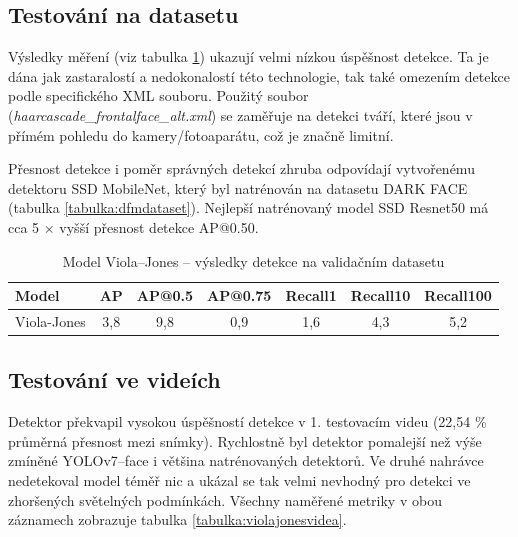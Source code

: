 \subsection*{Testování na datasetu}
Výsledky měření (viz tabulka \ref{tabulka:violajones}) ukazují velmi nízkou úspěšnost detekce. Ta je dána jak zastaralostí a nedokonalostí této technologie, tak také omezením detekce podle specifického XML souboru. Použitý soubor (\emph{haarcascade\_frontalface\_alt.xml}) se zaměřuje na detekci tváří, které jsou v přímém pohledu do kamery/fotoaparátu, což je značně limitní. 

Přesnost detekce i poměr správných detekcí zhruba odpovídají vytvořenému detektoru SSD MobileNet, který byl natrénován na datasetu DARK FACE (tabulka \ref{tabulka:dfmdataset}). Nejlepší natrénovaný model SSD Resnet50 má cca 5 $\times$ vyšší přesnost detekce AP@0.50.

\begin{table}[H]
  \begin{center}
    \begin{tabular}{|l|c|c|c|c|c|c|}
    \hline
    \rowcolor[HTML]{E0DBDB} 
    \textbf{Model}                      & \textbf{AP} & \textbf{AP@0.5} & \textbf{AP@0.75} & \textbf{Recall1} & \textbf{Recall10} & \textbf{Recall100} \\ \hline
    \cellcolor[HTML]{E0DBDB}Viola-Jones & 3,8         & 9,8             & 0,9              & 1,6              & 4,3               & 5,2                \\ \hline
    \end{tabular}
    \label{tabulka:violajones}
    \caption{Model Viola--Jones -- výsledky detekce na validačním datasetu}
  \end{center}
\end{table}

\subsection*{Testování ve videích}
Detektor překvapil vysokou úspěšností detekce v 1. testovacím videu (22,54 \% průměrná přesnost mezi snímky). Rychlostně byl detektor pomalejší než výše zmíněné YOLOv7--face i většina natrénovaných detektorů. Ve druhé nahrávce nedetekoval model téměř nic a ukázal se tak velmi nevhodný pro detekci ve zhoršených světelných podmínkách. Všechny naměřené metriky v obou záznamech zobrazuje tabulka \ref{tabulka:violajonesvidea}.

